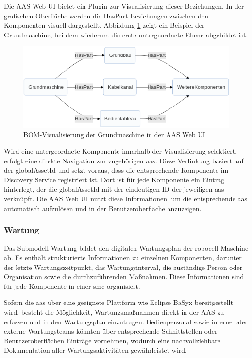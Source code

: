Die AAS Web UI bietet ein Plugin zur Visualisierung dieser Beziehungen. 
In der grafischen Oberfläche werden die HasPart-Beziehungen zwischen den Komponenten visuell dargestellt. 
Abbildung \ref{fig:BOMVisualisierungUI} zeigt ein Beispiel der Grundmaschine, bei dem wiederum die erste untergeordnete Ebene abgebildet ist.

\begin{figure}[htbp]
    \centering
        \includegraphics{Bilder/Ergebnisse/StatischeDaten/BOMVisualisierungUIpng.png}
    \caption{BOM-Visualisierung der Grundmaschine in der AAS Web UI}
    \label{fig:BOMVisualisierungUI}
\end{figure}

Wird eine untergeordnete Komponente innerhalb der Visualisierung selektiert, erfolgt eine direkte Navigation zur zugehörigen \acs{aas}. 
Diese Verlinkung basiert auf der globalAssetId und setzt voraus, dass die entsprechende Komponente im Discovery Service registriert ist. 
Dort ist für jede Komponente ein Eintrag hinterlegt, der die globalAssetId mit der eindeutigen ID der jeweiligen \acs{aas} verknüpft. 
Die AAS Web UI nutzt diese Informationen, um die entsprechende \acs{aas} automatisch aufzulösen und in der Benutzeroberfläche anzuzeigen.

\subsubsection*{Wartung}
\vspace{-0.5em}
Das Submodell Wartung bildet den digitalen Wartungsplan der robocell-Maschine ab. 
Es enthält strukturierte Informationen zu einzelnen Komponenten, darunter der letzte Wartungszeitpunkt, das Wartungsinterval, die zuständige Person oder Organisation sowie die durchzuführenden Maßnahmen. 
Diese Informationen sind für jede Komponente in einer \acs{smc} organisiert.

Sofern die \acs{aas} über eine geeignete Plattform wie Eclipse BaSyx bereitgestellt wird, besteht die Möglichkeit, Wartungsmaßnahmen direkt in der AAS zu erfassen und in den Wartungsplan einzutragen. 
Bedienpersonal sowie interne oder externe Wartungsteams könnten über entsprechende Schnittstellen oder Benutzeroberflächen Einträge vornehmen, wodurch eine nachvollziehbare Dokumentation aller Wartungsaktivitäten gewährleistet wird.

